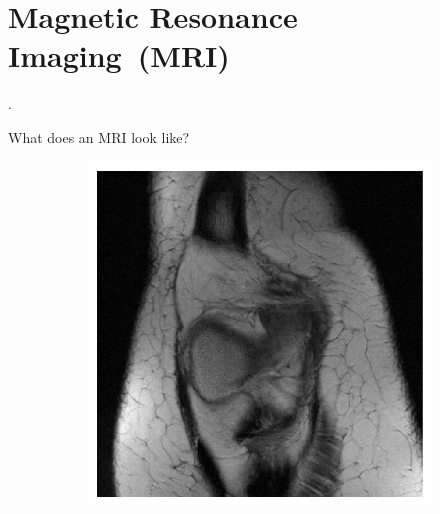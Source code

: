 \section{Magnetic Resonance Imaging~(MRI)}

\begin{frame}[plain,c]

    \begin{center}
        \color{DarkBlue}
    \Huge \thesection. \insertsection
    \end{center}

\end{frame}

\begin{frame}{What does an MRI look like?}
    \begin{figure}
        \centering
        \begin{subfigure}{0.45\textwidth}
            \includegraphics[height=0.6\textheight]{Figures/intro_figures/example_knee_fastmri.pdf}
        \end{subfigure}
        \begin{subfigure}{0.45\textwidth}

\end{subfigure}
\end{figure}
\end{frame}
